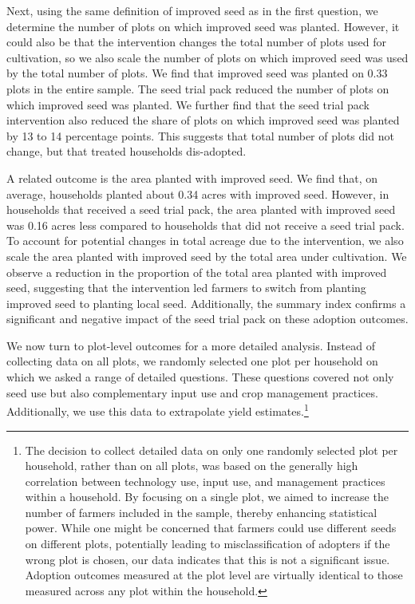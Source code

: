 \documentclass[english]{article}\usepackage[]{graphicx}\usepackage[]{xcolor}
\begin{document}
Next, using the same definition of improved seed as in the first question,
we determine the number of plots on which improved seed was planted.
However, it could also be that the intervention changes the total
number of plots used for cultivation, so we also scale the number
of plots on which improved seed was used by the total number of plots.
We find that improved seed was planted on 0.33 plots in the entire
sample. The seed trial pack reduced the number of plots on which improved
seed was planted. We further find that the seed trial pack intervention
also reduced the share of plots on which improved seed was planted
by 13 to 14 percentage points. This suggests that total number of
plots did not change, but that treated households dis-adopted.

A related outcome is the area planted with improved seed. We find
that, on average, households planted about 0.34 acres with improved
seed. However, in households that received a seed trial pack, the
area planted with improved seed was 0.16 acres less compared to households
that did not receive a seed trial pack. To account for potential changes
in total acreage due to the intervention, we also scale the area planted
with improved seed by the total area under cultivation. We observe
a reduction in the proportion of the total area planted with improved
seed, suggesting that the intervention led farmers to switch from
planting improved seed to planting local seed. Additionally, the summary
index confirms a significant and negative impact of the seed trial
pack on these adoption outcomes.

We now turn to plot-level outcomes for a more detailed analysis. Instead
of collecting data on all plots, we randomly selected one plot per
household on which we asked a range of detailed questions. These questions
covered not only seed use but also complementary input use and crop
management practices. Additionally, we use this data to extrapolate
yield estimates.\footnote{The decision to collect detailed data on only one randomly selected
plot per household, rather than on all plots, was based on the generally
high correlation between technology use, input use, and management
practices within a household. By focusing on a single plot, we aimed
to increase the number of farmers included in the sample, thereby
enhancing statistical power. While one might be concerned that farmers
could use different seeds on different plots, potentially leading
to misclassification of adopters if the \textquotedbl wrong\textquotedbl{}
plot is chosen, our data indicates that this is not a significant
issue. Adoption outcomes measured at the plot level are virtually
identical to those measured across any plot within the household.} 
\end{document}
